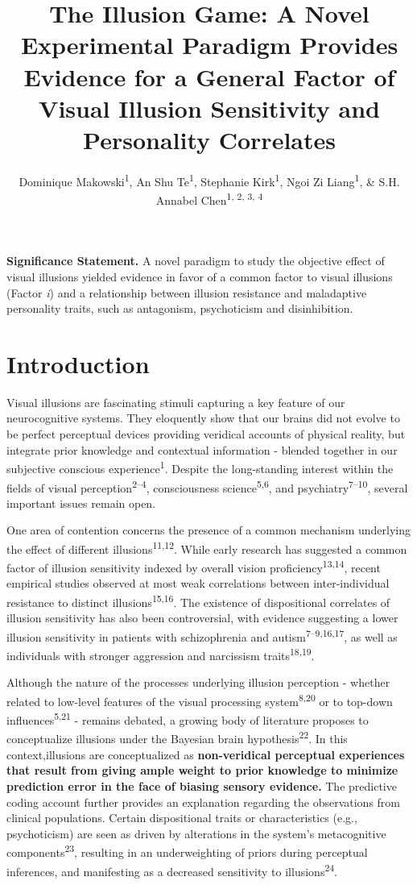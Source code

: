 \documentclass[
  man,floatsintext]{apa6}
\title{\textbf{The Illusion Game: A Novel Experimental Paradigm Provides Evidence for a General Factor of Visual Illusion Sensitivity and Personality Correlates}}
\author{Dominique Makowski\textsuperscript{1}, An Shu Te\textsuperscript{1}, Stephanie Kirk\textsuperscript{1}, Ngoi Zi Liang\textsuperscript{1}, \& S.H. Annabel Chen\textsuperscript{1, 2, 3, 4}}
\date{}
\affiliation{\vspace{0.5cm}\textsuperscript{1} School of Social Sciences, Nanyang Technological University, Singapore\\\textsuperscript{2} LKC Medicine, Nanyang Technological University, Singapore\\\textsuperscript{3} National Institute of Education, Singapore\\\textsuperscript{4} Centre for Research and Development in Learning, Nanyang Technological University, Singapore}
\begin{document}
\maketitle

\textbf{Significance Statement.} A novel paradigm to study the objective effect of visual illusions yielded evidence in favor of a common factor to visual illusions (Factor \emph{i}) and a relationship between illusion resistance and maladaptive personality traits, such as antagonism, psychoticism and disinhibition.

\hypertarget{introduction}{%
\section{Introduction}\label{introduction}}

Visual illusions are fascinating stimuli capturing a key feature of our neurocognitive systems. They eloquently show that our brains did not evolve to be perfect perceptual devices providing veridical accounts of physical reality, but integrate prior knowledge and contextual information - blended together in our subjective conscious experience\textsuperscript{1}. Despite the long-standing interest within the fields of visual perception\textsuperscript{2--4}, consciousness science\textsuperscript{5,6}, and psychiatry\textsuperscript{7--10}, several important issues remain open.

One area of contention concerns the presence of a common mechanism underlying the effect of different illusions\textsuperscript{11,12}. While early research has suggested a common factor of illusion sensitivity indexed by overall vision proficiency\textsuperscript{13,14}, recent empirical studies observed at most weak correlations between inter-individual resistance to distinct illusions\textsuperscript{15,16}. The existence of dispositional correlates of illusion sensitivity has also been controversial, with evidence suggesting a lower illusion sensitivity in patients with schizophrenia and autism\textsuperscript{7--9,16,17}, as well as individuals with stronger aggression and narcissism traits\textsuperscript{18,19}.

Although the nature of the processes underlying illusion perception - whether related to low-level features of the visual processing system\textsuperscript{8,20} or to top-down influences\textsuperscript{5,21} - remains debated, a growing body of literature proposes to conceptualize illusions under the Bayesian brain hypothesis\textsuperscript{22}. In this context,illusions are conceptualized as \textbf{non-veridical perceptual experiences that result from giving ample weight to prior knowledge to minimize prediction error in the face of biasing sensory evidence.} The predictive coding account further provides an explanation regarding the observations from clinical populations. Certain dispositional traits or characteristics (e.g., psychoticism) are seen as driven by alterations in the system's metacognitive components\textsuperscript{23}, resulting in an underweighting of priors during perceptual inferences, and manifesting as a decreased sensitivity to illusions\textsuperscript{24}.
\end{document}
